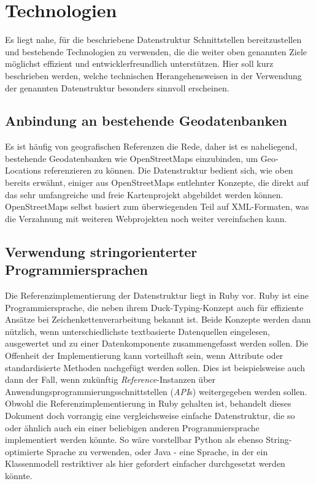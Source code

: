 \section{Technologien}
\label{technologies}
Es liegt nahe, für die beschriebene Datenstruktur Schnittstellen bereitzustellen und bestehende Technologien zu verwenden, die die weiter oben genannten Ziele möglichst effizient und entwicklerfreundlich unterstützen. Hier soll kurz beschrieben werden, welche technischen Herangehensweisen in der Verwendung der genannten Datenstruktur besonders sinnvoll erscheinen.

\subsection{Anbindung an bestehende Geodatenbanken}
Es ist häufig von geografischen Referenzen die Rede, daher ist es naheliegend, bestehende Geodatenbanken wie OpenStreetMaps einzubinden, um Geo-Locations referenzieren zu können. Die Datenstruktur bedient sich, wie oben bereits erwähnt, einiger aus OpenStreetMaps entlehnter Konzepte, die direkt auf das sehr umfangreiche und freie Kartenprojekt abgebildet werden können. OpenStreetMaps selbst basiert zum überwiegenden Teil auf XML-Formaten, was die Verzahnung mit weiteren Webprojekten noch weiter vereinfachen kann.

\subsection{Verwendung stringorienterter Programmiersprachen}
Die Referenzimplementierung der Datenstruktur liegt in Ruby vor\cite{georeferencegem}. Ruby ist eine Programmiersprache, die neben ihrem Duck-Typing-Konzept auch für effiziente Ansätze bei Zeichenkettenverarbeitung bekannt ist. Beide Konzepte werden dann nützlich, wenn unterschiedlichste textbasierte Datenquellen eingelesen, ausgewertet und zu einer Datenkomponente zusammengefasst werden sollen. Die Offenheit der Implementierung kann vorteilhaft sein, wenn Attribute oder standardisierte Methoden nachgefügt werden sollen. Dies ist beispielsweise auch dann der Fall, wenn zukünftig \textit{Reference}-Instanzen über Anwendungsprogrammierungsschnittstellen (\textit{API}s) weitergegeben werden sollen. Obwohl die Referenzimplementierung in Ruby gehalten ist, behandelt dieses Dokument doch vorrangig eine vergleichsweise einfache Datenstruktur, die so oder ähnlich auch ein einer beliebigen anderen Programmiersprache implementiert werden könnte. So wäre vorstellbar Python als ebenso String-optimierte Sprache zu verwenden, oder Java - eine Sprache, in der ein Klassenmodell restriktiver als hier gefordert einfacher durchgesetzt werden könnte.

